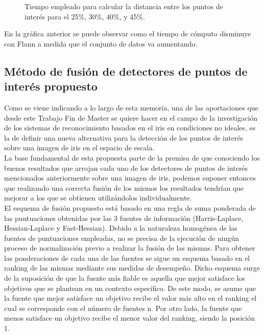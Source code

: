 \begin{figure}[htbp]
\centering
{}
\caption{Tiempo empleado para calcular la distancia entre los puntos de interés para el 25\%, 30\%, 40\%, y 45\%.} \label{fig:señales}
\end{figure} 

\newpage

En la gráfica anterior se puede observar como el tiempo de cómputo disminuye con Flann a medida que el conjunto de datos va aumentando. 


\subsection{Método de fusión de detectores de puntos de interés propuesto}
Como se viene indicando a lo largo de esta memoria, una de las aportaciones que desde este Trabajo Fin de Master se quiere hacer en el campo de la investigación de los sistemas de reconocimiento basados en el iris en condiciones no ideales, es la de definir una nueva alternativa para la detección de los puntos de interés sobre una imagen de iris en el espacio de escala. \\

La base fundamental de esta propuesta parte de la premisa de que conociendo los buenos resultados que arrojan cada uno de los detectores de puntos de interés mencionados anteriormente sobre una imagen de iris, podemos suponer entonces que realizando una correcta fusión de los mismos los resultados tendrían que mejorar a los que se obtienen utilizándolos individualmente. \\

El esquema de fusión propuesto está basado en una regla de suma ponderada de las puntuaciones obtenidas por las 3 fuentes de información (Harris-Laplace, Hessian-Laplace y Fast-Hessian). Debido a la naturaleza homogénea de las fuentes de puntuaciones empleadas, no se precisa de la ejecución de ningún proceso de normalización previo a realizar la fusión de las mismas. Para obtener las ponderaciones de cada una de las fuentes se sigue un esquema basado en el ranking de las mismas mediante sus medidas de desempeño. Dicho esquema surge de la suposición de que la fuente más fiable es aquella que mejor satisface los objetivos que se plantean en un contexto específico. De este modo, se asume que la fuente que mejor satisface un objetivo recibe el valor más alto en el ranking el cual se corresponde con el número de fuentes n. Por otro lado, la fuente que menos satisface un objetivo recibe el menor valor del ranking, siendo la posición 1. \\

